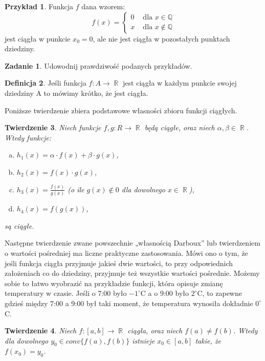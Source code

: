 \documentclass[12pt,a4paper]{article}
\newtheorem{tw}{Twierdzenie}[section]
\theoremstyle{definition}
\newtheorem{df}[tw]{Definicja}
\newtheorem{ex}[tw]{Przykład}
\newtheorem{zad}{Zadanie}
\DeclareMathOperator{\R}{\mathbb{R}}
\begin{document}
\begin{ex}Funkcja $f$ dana wzorem:
\[ 
f(x)=\left\{\begin{matrix}
0 & \textrm{ dla } x \in \mathbb{Q} \\
x & \textrm{ dla } x \notin \mathbb{Q}
\end{matrix}\right.
\]
jest ciągła w punkcie $x_{0} = 0$, ale nie jest ciągła w pozostałych punktach dziedziny.
\end{ex}
\begin{zad}
Udowodnij prawdziwość podanych przykładów.
\end{zad}
\begin{df}Jeśli funkcja $f : A \rightarrow \R$ jest ciągła w każdym punkcie swojej dziedziny A to mówimy krótko, że jest ciągła.
\end{df}
Poniższe twierdzenie zbiera podstawowe własności zbioru funkcji ciągłych.
\begin{tw}Niech funkcje $f, g : R \rightarrow \R$ będą ciągłe, oraz niech $\alpha, \beta \in \R$.
Wtedy funkcje:
\begin{enumerate}[a)]
\item $h_{1}(x) = \alpha \cdot  f(x) + \beta \cdot g(x)$,
\item $h_{2}(x) = f(x) \cdot  g(x)$,
\item $h_{3}(x) = \frac{f(x)}{g(x)}$
(o ile $g(x) \notin 0$ dla dowolnego $x \in \R$),
\item $h_{4}(x) = f(g(x))$,
\end{enumerate}
są ciągłe.
\end{tw}
Następne twierdzenie zwane powszechnie „własnością Darboux” lub twierdzeniem o wartości pośredniej ma liczne praktyczne zastosowania. Mówi ono o tym, że jeśli 
funkcja ciągła przyjmuje jakieś dwie wartości, to przy odpowiednich założeniach co do dziedziny, przyjmuje też wszystkie wartości pośrednie. Możemy sobie to 
łatwo wyobrazić na przykładzie funkcji, która opisuje zmianę temperatury w czasie.
Jeśli o 7:00 było $-1^{\circ}$C a o 9:00 było $2^{\circ}$C, to zapewne gdzieś między 7:00 a 9:00 był taki moment, że temperatura wynosiła dokładnie 
$0^{\circ}$C.

\begin{tw}Niech $f : [a, b] \rightarrow \R$ ciągła, oraz niech $f(a) \neq f(b)$. Wtedy dla dowolnego $y_{0} \in conv\{f(a), f(b)\}$ istnieje $x_{0} \in [a, b]$ 
takie, że $f(x_{0}) = y_{0}$.
\end{tw}
\end{document}

